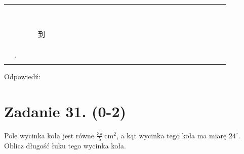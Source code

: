 \documentclass[10pt]{article}
\begin{document}
\begin{center}
\begin{tabular}{|c|c|c|c|c|c|c|c|c|c|c|c|c|c|c|c|c|c|c|c|c|c|c|c|c|c|c|c|c|c|}
\hline
 &  &  &  &  &  &  &  &  &  &  &  &  &  &  &  &  &  &  &  &  &  &  &  &  &  &  &  &  &  \\
\hline
 &  &  &  &  &  &  &  &  &  &  &  &  &  &  &  &  &  &  &  &  &  &  &  &  &  &  &  &  &  \\
\hline
 &  &  &  &  &  &  &  &  &  &  &  &  &  &  &  &  &  &  &  &  &  &  &  &  &  &  &  &  &  \\
\hline
 &  &  &  &  &  &  &  &  &  &  &  &  &  &  &  &  &  &  &  &  &  &  &  &  &  &  &  &  &  \\
\hline
 &  &  &  &  &  &  &  &  &  &  &  &  &  &  &  &  &  &  &  &  &  &  &  &  &  &  &  &  &  \\
\hline
 &  &  &  &  &  &  &  &  &  &  &  &  &  &  &  &  &  &  &  &  &  &  &  &  &  &  &  &  &  \\
\hline
 &  &  &  &  &  &  &  &  &  &  &  &  &  &  &  &  &  &  &  &  &  &  &  &  &  &  &  &  &  \\
\hline
 &  &  &  &  &  &  &  &  &  &  &  &  &  &  &  &  &  &  &  &  &  &  &  &  &  &  &  &  &  \\
\hline
 &  &  &  &  &  &  &  &  &  &  &  &  &  &  &  &  &  &  &  &  &  &  &  &  &  &  &  &  &  \\
\hline
 &  &  &  &  &  &  &  &  &  &  &  &  &  &  &  &  &  &  &  &  &  &  &  &  &  &  &  &  &  \\
\hline
 &  &  &  & 到 &  &  &  &  &  &  &  &  &  &  &  &  &  &  &  &  &  &  &  &  &  &  &  &  &  \\
\hline
 &  &  &  &  &  &  &  &  &  &  &  &  &  &  &  &  &  &  &  &  &  &  &  &  &  &  &  &  &  \\
\hline
 &  &  &  &  &  &  &  &  &  &  &  &  &  &  &  &  &  &  &  &  &  &  &  &  &  &  &  &  &  \\
\hline
 &  &  &  &  &  &  &  &  &  &  &  &  &  &  &  &  &  &  &  &  &  &  &  &  &  &  &  &  &  \\
\hline
 & . &  &  &  &  &  &  &  &  &  &  &  &  &  &  &  &  &  &  &  &  &  &  &  &  &  &  &  &  \\
\hline
 &  &  &  &  &  &  &  &  &  &  &  &  &  &  &  &  &  &  &  &  &  &  &  &  &  &  &  &  &  \\
\hline
\end{tabular}
\end{center}

Odpowiedź:

\section*{Zadanie 31. (0-2)}
Pole wycinka koła jest równe \(\frac{3 \pi}{5} \mathrm{~cm}^{2}\), a kąt wycinka tego koła ma miarę \(24^{\circ}\). Oblicz długość łuku tego wycinka koła.
\end{document}
